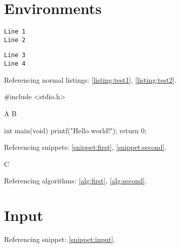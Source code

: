 \documentclass{book}
\begin{document}

\chapter{Environments}

\begin{lstlisting}[caption={Test 1},label={listing:test1},name={test}]
Line 1
Line 2
\end{lstlisting}

\begin{lstlisting}[caption={Test 2},label={listing:test2},name={test}]
Line 3
Line 4
\end{lstlisting}

Referencing normal listings: \autoref{listing:test1}, \autoref{listing:test2}.

\begin{codesnippet}[caption={First snippet},label={snippet:first},name={hello}]
#include <stdio.h>
\end{codesnippet}

\begin{algorithm}[caption={First algorithm},label={alg:first},name={myalg}]
A
B
\end{algorithm}

\begin{codesnippet}[caption={Second snippet},label={snippet:second},name={hello}]
int main(void)
{
  printf("Hello world!\n");
  return 0;
}
\end{codesnippet}

Referencing snippets: \autoref{snippet:first}, \autoref{snippet:second}.

\begin{algorithm}[caption={Second algorithm},label={alg:second},name={myalg}]
C
\end{algorithm}

Referencing algorithms: \autoref{alg:first}, \autoref{alg:second}.

\chapter{Input}

Referencing snippet: \autoref{snippet:input}.
\end{document}
